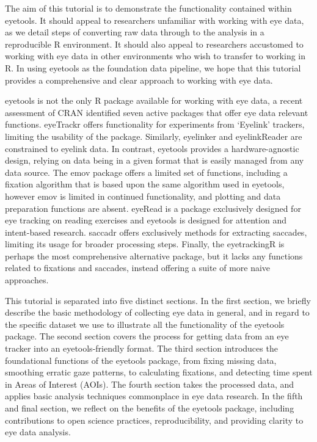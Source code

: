\documentclass[
  man,
  floatsintext,
  longtable,
  nolmodern,
  notxfonts,
  notimes,
  colorlinks=true,linkcolor=blue,citecolor=blue,urlcolor=blue]{apa7}
\begin{document}
The aim of this tutorial is to demonstrate the functionality contained
within eyetools. It should appeal to researchers unfamiliar with working
with eye data, as we detail steps of converting raw data through to the
analysis in a reproducible R environment. It should also appeal to
researchers accustomed to working with eye data in other environments
who wish to transfer to working in R. In using eyetools as the
foundation data pipeline, we hope that this tutorial provides a
comprehensive and clear approach to working with eye data.

eyetools is not the only R package available for working with eye data,
a recent assessment of CRAN identified seven active packages that offer
eye data relevant functions. eyeTrackr offers functionality for
experiments from `Eyelink' trackers, limiting the usability of the
package. Similarly, eyelinker and eyelinkReader are constrained to
eyelink data. In contrast, eyetools provides a hardware-agnostic design,
relying on data being in a given format that is easily managed from any
data source. The emov package offers a limited set of functions,
including a fixation algorithm that is based upon the same algorithm
used in eyetools, however emov is limited in continued functionality,
and plotting and data preparation functions are absent. eyeRead is a
package exclusively designed for eye tracking on reading exercises and
eyetools is designed for attention and intent-based research. saccadr
offers exclusively methods for extracting saccades, limiting its usage
for broader processing steps. Finally, the eyetrackingR is perhaps the
most comprehensive alternative package, but it lacks any functions
related to fixations and saccades, instead offering a suite of more
naive approaches.

This tutorial is separated into five distinct sections. In the first
section, we briefly describe the basic methodology of collecting eye
data in general, and in regard to the specific dataset we use to
illustrate all the functionality of the eyetools package. The second
section covers the process for getting data from an eye tracker into an
eyetools-friendly format. The third section introduces the foundational
functions of the eyetools package, from fixing missing data, smoothing
erratic gaze patterns, to calculating fixations, and detecting time
spent in Areas of Interest (AOIs). The fourth section takes the
processed data, and applies basic analysis techniques commonplace in eye
data research. In the fifth and final section, we reflect on the
benefits of the eyetools package, including contributions to open
science practices, reproducibility, and providing clarity to eye data
analysis.
\end{document}
